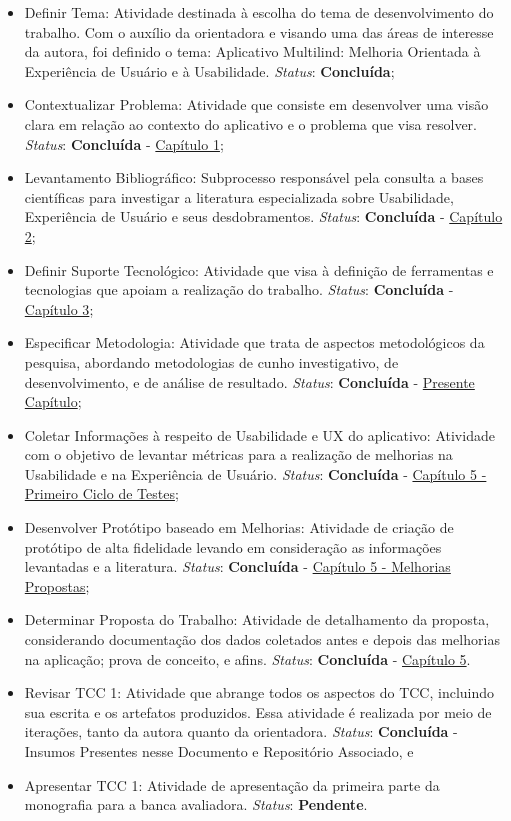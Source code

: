 \begin{itemize}
	\item Definir Tema: Atividade destinada à escolha do tema de desenvolvimento do trabalho. Com o auxílio da orientadora e visando uma das áreas de interesse da autora, foi definido o tema: Aplicativo Multilind: Melhoria Orientada à
	Experiência de Usuário e à Usabilidade. \textit{Status}: \textbf{Concluída};
	\item Contextualizar Problema: Atividade que consiste em desenvolver uma visão clara em relação ao contexto do aplicativo e o problema que visa resolver. \textit{Status}: \textbf{Concluída} - \hyperref[chap:Introducao]{Capítulo 1};
	\item Levantamento Bibliográfico: Subprocesso responsável pela consulta a bases científicas para investigar a literatura especializada sobre Usabilidade, Experiência de Usuário e seus desdobramentos. \textit{Status}: \textbf{Concluída} - \hyperref[chap:Referencial]{Capítulo 2};
	\item Definir Suporte Tecnológico: Atividade que visa à definição de ferramentas e tecnologias que apoiam a realização do trabalho. \textit{Status}: \textbf{Concluída} - \hyperref[chap:ReferencialTech]{Capítulo 3};
	\item Especificar Metodologia: Atividade que trata de aspectos metodológicos da  pesquisa, abordando metodologias de cunho investigativo, de desenvolvimento, e de análise de resultado. \textit{Status}: \textbf{Concluída} - \hyperref[chap:Metodologia]{Presente Capítulo};
	\item Coletar Informações à respeito de Usabilidade e UX do aplicativo: Atividade com o objetivo de levantar métricas para a realização de melhorias na Usabilidade e na Experiência de Usuário. \textit{Status}: \textbf{Concluída} - \hyperref[sec:Primeiro Ciclo]{Capítulo 5 - Primeiro Ciclo de Testes};
	\item Desenvolver Protótipo baseado em Melhorias: Atividade de criação de protótipo de alta fidelidade levando em consideração as informações levantadas e a literatura. \textit{Status}: \textbf{Concluída} - \hyperref[sec:Melhorias Propostas]{Capítulo 5 - Melhorias Propostas};
	\item Determinar Proposta do Trabalho: Atividade de detalhamento da proposta, considerando documentação dos dados coletados antes e depois das melhorias na aplicação; prova de conceito, e afins. \textit{Status}: \textbf{Concluída} - \hyperref[chap:Proposta]{Capítulo 5}.
	\item Revisar TCC 1: Atividade que abrange todos os aspectos do TCC, incluindo sua escrita e os artefatos produzidos. Essa atividade é realizada por meio de iterações, tanto da autora quanto da orientadora. \textit{Status}: \textbf{Concluída} -  Insumos Presentes nesse Documento e Repositório Associado, e
	\item Apresentar TCC 1: Atividade de apresentação da primeira parte da monografia para a banca avaliadora. \textit{Status}: \textbf{Pendente}.
\end{itemize}

